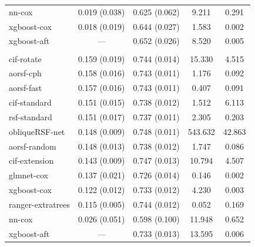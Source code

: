\documentclass[12pt]{article}\usepackage[]{graphicx}\usepackage[]{xcolor}
\newenvironment{knitrout}{}{} %
\begin{document}
\begin{knitrout}
\begin{longtable}[t]{lcccc}
\hspace{1em}nn-cox & 0.019 (0.038) & 0.625 (0.062) & 9.211 & 0.291\\
\hspace{1em}xgboost-cox & 0.018 (0.019) & 0.644 (0.027) & 1.583 & 0.002\\
\hspace{1em}xgboost-aft & --- & 0.652 (0.026) & 8.520 & 0.005\\
\addlinespace[0.3em]
\multicolumn{5}{l}{\textit{\textbf{Monoclonal gammopathy; death, n = 1384, p = 8}}}\\
\hline
\hspace{1em}cif-rotate & 0.159 (0.019) & 0.744 (0.014) & 15.330 & 4.515\\
\hspace{1em}aorsf-cph & 0.158 (0.016) & 0.743 (0.011) & 1.176 & 0.092\\
\hspace{1em}aorsf-fast & 0.157 (0.016) & 0.743 (0.011) & 0.407 & 0.091\\
\hspace{1em}cif-standard & 0.151 (0.015) & 0.738 (0.012) & 1.512 & 6.113\\
\hspace{1em}rsf-standard & 0.151 (0.017) & 0.737 (0.011) & 2.305 & 0.203\\
\hspace{1em}obliqueRSF-net & 0.148 (0.009) & 0.748 (0.011) & 543.632 & 42.863\\
\hspace{1em}aorsf-random & 0.148 (0.013) & 0.738 (0.012) & 1.747 & 0.086\\
\hspace{1em}cif-extension & 0.143 (0.009) & 0.747 (0.013) & 10.794 & 4.507\\
\hspace{1em}glmnet-cox & 0.137 (0.021) & 0.726 (0.014) & 0.146 & 0.002\\
\hspace{1em}xgboost-cox & 0.122 (0.012) & 0.733 (0.012) & 4.230 & 0.003\\
\hspace{1em}ranger-extratrees & 0.115 (0.005) & 0.744 (0.012) & 0.052 & 0.169\\
\hspace{1em}nn-cox & 0.026 (0.051) & 0.598 (0.100) & 11.948 & 0.652\\
\hspace{1em}xgboost-aft & --- & 0.733 (0.013) & 13.595 & 0.006\\

\end{longtable}
\end{knitrout}
\end{document}
